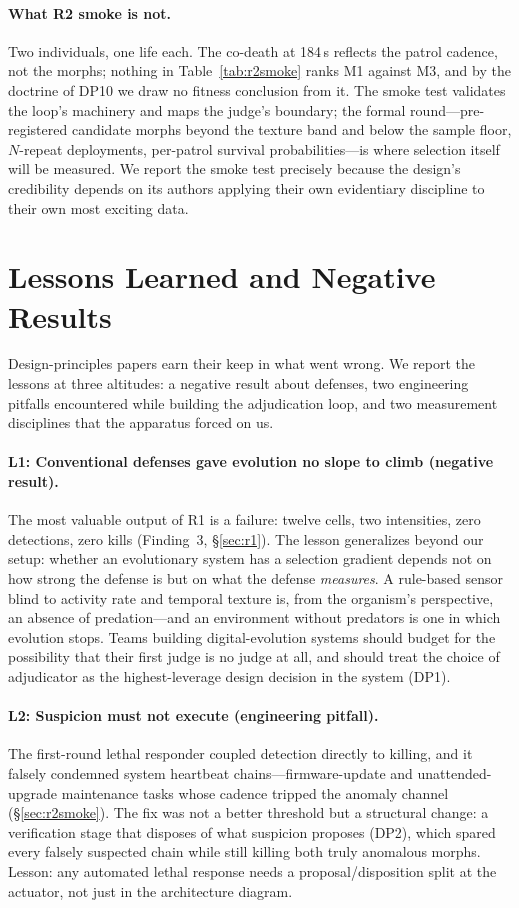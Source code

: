 \documentclass[11pt,a4paper]{article}
\begin{document}
\paragraph{What R2 smoke is not.} Two individuals, one life each. The co-death at 184\,s reflects the patrol cadence, not the morphs; nothing in Table~\ref{tab:r2smoke} ranks M1 against M3, and by the doctrine of DP10 we draw no fitness conclusion from it. The smoke test validates the loop's machinery and maps the judge's boundary; the formal round---pre-registered candidate morphs beyond the texture band and below the sample floor, $N$-repeat deployments, per-patrol survival probabilities---is where selection itself will be measured. We report the smoke test precisely because the design's credibility depends on its authors applying their own evidentiary discipline to their own most exciting data.

\section{Lessons Learned and Negative Results}
\label{sec:lessons}

Design-principles papers earn their keep in what went wrong. We report the lessons at three altitudes: a negative result about defenses, two engineering pitfalls encountered while building the adjudication loop, and two measurement disciplines that the apparatus forced on us.

\paragraph{L1: Conventional defenses gave evolution no slope to climb (negative result).} The most valuable output of R1 is a failure: twelve cells, two intensities, zero detections, zero kills (Finding~3, \S\ref{sec:r1}). The lesson generalizes beyond our setup: whether an evolutionary system has a selection gradient depends not on how strong the defense is but on what the defense \emph{measures}. A rule-based sensor blind to activity rate and temporal texture is, from the organism's perspective, an absence of predation---and an environment without predators is one in which evolution stops. Teams building digital-evolution systems should budget for the possibility that their first judge is no judge at all, and should treat the choice of adjudicator as the highest-leverage design decision in the system (DP1).

\paragraph{L2: Suspicion must not execute (engineering pitfall).} The first-round lethal responder coupled detection directly to killing, and it falsely condemned system heartbeat chains---firmware-update and unattended-upgrade maintenance tasks whose cadence tripped the anomaly channel (\S\ref{sec:r2smoke}). The fix was not a better threshold but a structural change: a verification stage that disposes of what suspicion proposes (DP2), which spared every falsely suspected chain while still killing both truly anomalous morphs. Lesson: any automated lethal response needs a proposal/disposition split at the actuator, not just in the architecture diagram.
\end{document}
